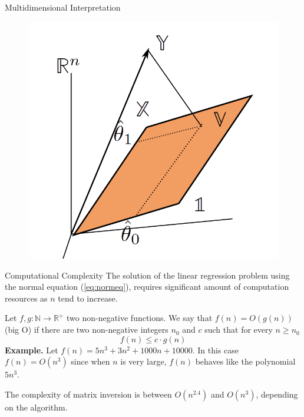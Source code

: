 \documentclass{beamer}
\begin{document}
\begin{frame}{Multidimensional Interpretation}
	
	\begin{figure}[h]
		\centering
		\includegraphics[scale=0.5]{../../Figures/fig_projection.png}
	\end{figure}
\end{frame}

\begin{frame}{Computational Complexity}
	The solution of the linear regression problem using the normal equation (\ref{eq:normeq}), requires significant amount of computation resources as $n$ tend to increase.
	
	Let $f,g \colon \mathbb{N} \to \mathbb{R}^+$ two non-negative functions. We say that $f(n)= O(g(n))$ (big O) if there are two non-negative integers $n_0$ and $c$ such that for every $n\ge n_0$
	\begin{equation*}
		f(n) \le c \cdot  g(n)
	\end{equation*}
  {\bf Example.} Let $f(n)=5n^3+3n^2+1000n +10000$. In this case $f(n)=O(n^3)$ since when $n$ is very large, $f(n)$ behaves like the polynomial $5n^3$.
  
  The complexity of matrix inversion is between $O(n^{2.4})$ and $O(n^3)$, depending on the algorithm.
\end{frame}			
\end{document}
